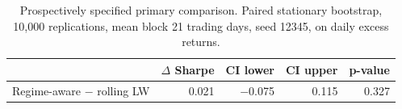 \begin{table}[htbp]
\caption{Prospectively specified primary comparison. Paired stationary bootstrap, 10{,}000 replications, mean block 21 trading days, seed 12345, on daily excess returns.}
\label{tab:table2_primary_inference}
\small
\begin{tabular}{lrrrr}
\toprule
 & $\Delta$ Sharpe & CI lower & CI upper & p-value \\
\midrule
Regime-aware $-$ rolling LW & 0.021 & $-$0.075 & 0.115 & 0.327 \\
\bottomrule
\end{tabular}
\end{table}
